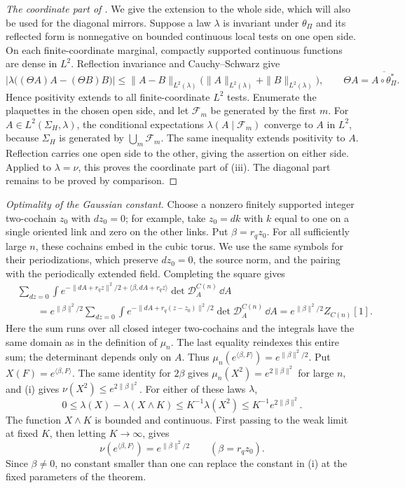 \begin{proof}[The coordinate part of ]
\label{par:side-density}
We give the extension to the whole side, which will also be used
for the diagonal mirrors. Suppose a law $\lambda$ is invariant
under $\theta_\Pi$ and its reflected form is nonnegative on
bounded continuous local tests on one open side. On each
finite-coordinate marginal, compactly supported continuous
functions are dense in $L^2$. Reflection invariance and
Cauchy--Schwarz give
\[
 \left|\lambda\bigl((\Theta A)A-(\Theta B)B\bigr)\right|
 \le\|A-B\|_{L^2(\lambda)}
       \bigl(\|A\|_{L^2(\lambda)}+\|B\|_{L^2(\lambda)}\bigr),
 \qquad \Theta A=\overline{A\circ\theta_\Pi^*}.
\]
Hence positivity extends to all finite-coordinate $L^2$ tests.
Enumerate the plaquettes in the chosen open side, and let
$\mathcal F_m$ be generated by the first $m$. For
$A\in L^2(\Sigma_H,\lambda)$, the conditional expectations
$\lambda(A\mid\mathcal F_m)$ converge to $A$ in $L^2$, because
$\Sigma_H$ is generated by $\bigcup_m\mathcal F_m$. The same
inequality extends positivity to $A$. Reflection carries one
open side to the other, giving the assertion on either side.
Applied to $\lambda=\nu$, this proves the coordinate part of
\textup{(iii)}. The diagonal part remains to be proved by comparison.
\end{proof}

\medskip\noindent
\emph{Optimality of the Gaussian constant.}
Choose a nonzero finitely supported integer two-cochain $z_0$ with
$dz_0=0$; for example, take $z_0=dk$ with $k$ equal to one on a
single oriented link and zero on the other links. Put $\beta=r_qz_0$.
For all sufficiently large $n$, these cochains embed in the cubic
torus. We use the same symbols for their periodizations, which
preserve $dz_0=0$, the source norm, and the pairing with the
periodically extended field. Completing the square gives
\[
\begin{split}
 &\sum_{dz=0}\int
 e^{-\|dA+r_qz\|^2/2+\langle\beta,dA+r_qz\rangle}
       \det\mathcal D_A^{C(n)}\,\dd A\\
 &\qquad =
 e^{\|\beta\|^2/2}\sum_{dz=0}\int
 e^{-\|dA+r_q(z-z_0)\|^2/2}
       \det\mathcal D_A^{C(n)}\,\dd A
 =e^{\|\beta\|^2/2}Z_{C(n)}[1].
\end{split}
\]
Here the sum runs over all closed integer two-cochains and the
integrals have the same domain as in the definition of $\mu_n$.
The last equality reindexes this entire sum; the determinant
depends only on $A$. Thus
$\mu_n(e^{\langle\beta,F\rangle})=e^{\|\beta\|^2/2}$.
Put $X(F)=e^{\langle\beta,F\rangle}$. The same identity for
$2\beta$ gives $\mu_n(X^2)=e^{2\|\beta\|^2}$ for large $n$,
and \textup{(i)} gives $\nu(X^2)\le e^{2\|\beta\|^2}$.
For either of these laws $\lambda$,
\[
 0\le\lambda(X)-\lambda(X\wedge K)
 \le K^{-1}\lambda(X^2)\le K^{-1}e^{2\|\beta\|^2}.
\]
The function $X\wedge K$ is bounded and continuous. First passing
to the weak limit at fixed $K$, then letting $K\to\infty$, gives
\[
 \nu(e^{\langle\beta,F\rangle})=e^{\|\beta\|^2/2}
 \qquad(\beta=r_qz_0).
\]
Since $\beta\ne0$, no constant smaller than one can replace the
constant in \textup{(i)} at the fixed parameters of the theorem.
